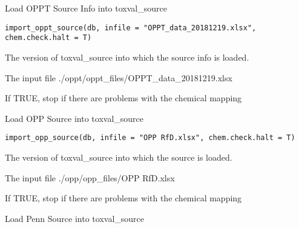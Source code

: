 \documentclass[letterpaper]{book}
\begin{document}
%
\begin{Description}\relax
Load OPPT Source Info into toxval\_source
\end{Description}
%
\begin{Usage}
\begin{verbatim}
import_oppt_source(db, infile = "OPPT_data_20181219.xlsx", chem.check.halt = T)
\end{verbatim}
\end{Usage}
%
\begin{Arguments}
\begin{ldescription}
\item[\code{db}] The version of toxval\_source into which the source info is loaded.

\item[\code{infile}] The input file ./oppt/oppt\_files/OPPT\_data\_20181219.xlsx

\item[\code{chem.check.halt}] If TRUE, stop if there are problems with the chemical mapping
\end{ldescription}
\end{Arguments}
%
\begin{Description}\relax
Load OPP Source into toxval\_source
\end{Description}
%
\begin{Usage}
\begin{verbatim}
import_opp_source(db, infile = "OPP RfD.xlsx", chem.check.halt = T)
\end{verbatim}
\end{Usage}
%
\begin{Arguments}
\begin{ldescription}
\item[\code{db}] The version of toxval\_source into which the source is loaded.

\item[\code{infile}] The input file ./opp/opp\_files/OPP RfD.xlsx

\item[\code{chem.check.halt}] If TRUE, stop if there are problems with the chemical mapping
\end{ldescription}
\end{Arguments}
%
\begin{Description}\relax
Load Penn Source into toxval\_source
\end{Description}
\end{document}
